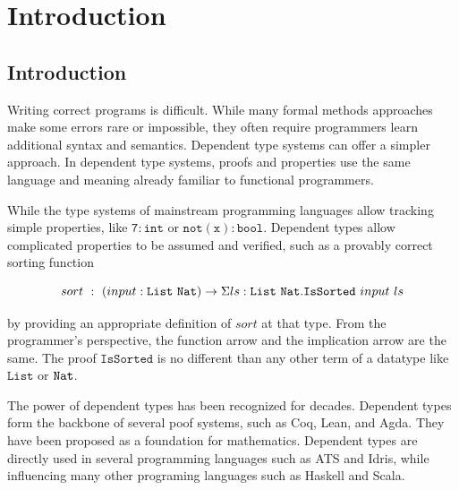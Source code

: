 \chapter{Introduction}
\label{chapter:Introduction}
\thispagestyle{myheadings}

\section{Introduction} %

Writing correct programs is difficult.
While many formal methods approaches make some errors rare or impossible, they often require programmers learn additional syntax and semantics.
Dependent type systems can offer a simpler approach.
In dependent type systems, proofs and properties use the same language and meaning already familiar to functional programmers.

While the type systems of mainstream programming languages allow tracking simple properties, like $\mathtt{7:int}$ or $\mathtt{not(x):bool}$.
Dependent types allow complicated properties to be assumed and verified, such as a provably correct sorting function

\[
sort\ :\ \left(input:\mathtt{List}\ \mathtt{Nat}{}\right)\rightarrow\Sigma ls:\mathtt{List}\ \mathtt{Nat}{}.\mathtt{IsSorted}\ input\ ls
\]

by providing an appropriate definition of $sort$ at that type.
From the programmer's perspective, the function arrow and the implication arrow are the same.
The proof $\mathtt{IsSorted}$ is no different than any other term of a datatype like $\mathtt{List}$ or $\mathtt{Nat}{}$.

The power of dependent types has been recognized for decades.
Dependent types form the backbone of several poof systems, such as Coq\cite{Coq12}, Lean\cite{10.1007/978-3-030-79876-5_37}, and Agda\cite{norell2007towards}.
They have been proposed as a foundation for mathematics\cite{Martin-Lof-1972,HoTTbook}.
Dependent types are directly used in several programming languages such as ATS\cite{DependentMLAnapproachtopracticalprogrammingwithdependenttypes} and Idris\cite{brady2013idris}, while influencing many other programing languages such as Haskell and Scala.

